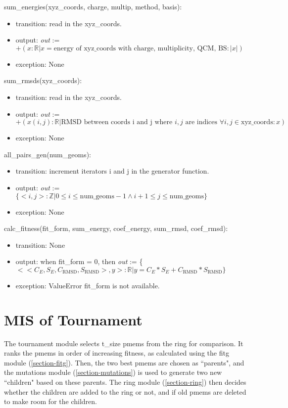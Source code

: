 \documentclass[12pt, titlepage]{article}
\begin{document}
\noindent sum\_energies(xyz\_coords, charge, multip, method, basis):
\begin{itemize}
	\item transition: read in the xyz\_coords. 
	\item output: \textit{out} := $+(x: \mathbb{R}|x = \text{energy of 
	xyz\_coords with charge, multiplicity, QCM, BS}: |x|)$
	\item exception: None
\end{itemize}

\noindent sum\_rmsds(xyz\_coords):
\begin{itemize}
	\item transition: read in the xyz\_coords.
	\item output: \textit{out} := $+(x(i,j): \mathbb{R}| \text{RMSD between 
	coords i and j where } i,j \text{ are indices } \forall i,j \in 
	\text{xyz\_coords}: x)$
	\item exception: None
\end{itemize}

\noindent all\_pairs\_gen(num\_geoms):
\begin{itemize}
	\item transition: increment iterators i and j in the generator function.
	\item output: \textit{out} := $\{<i,j>: \mathbb{Z} | 0 \leq i \leq 
	\text{num\_geoms}-1 \land i+1 \leq j \leq \text{num\_geoms}\}$
	\item exception: None
\end{itemize}


\noindent calc\_fitness(fit\_form, sum\_energy, coef\_energy, sum\_rmsd, 
coef\_rmsd):
\begin{itemize}
	\item transition: None
	\item output: when fit\_form = 0, then \textit{out} := \{
	$<<C_E,S_E,C_{\text{RMSD}},S_{\text{RMSD}}>,y> : \mathbb{R} | y = 
	C_E*S_E+C_{\text{RMSD}}*S_{\text{RMSD}} \}$
	\item exception: ValueError fit\_form is not available.
\end{itemize}

\section{MIS of Tournament} \label{section-tournament} 

The tournament module selects t\_size pmems from the ring for comparison. It 
ranks the pmems in order of increasing fitness, as calculated using the fitg 
module (\ref{section-fitg}). Then, the two best pmems are chosen as ``parents", 
and the mutations module (\ref{section-mutations}) is used to generate two new 
``children" based on these parents. The ring module (\ref{section-ring}) then 
decides whether the children are added to the ring or not, and if old pmems are 
deleted to make room for the children.
\end{document}

